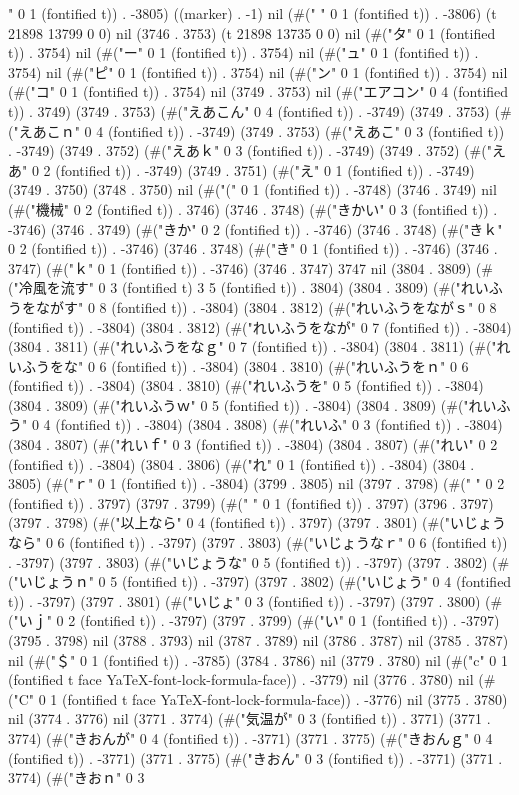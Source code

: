 " 0 1 (fontified t)) . -3805) ((marker) . -1) nil (#("	" 0 1 (fontified t)) . -3806) (t 21898 13799 0 0) nil (3746 . 3753) (t 21898 13735 0 0) nil (#("タ" 0 1 (fontified t)) . 3754) nil (#("ー" 0 1 (fontified t)) . 3754) nil (#("ュ" 0 1 (fontified t)) . 3754) nil (#("ピ" 0 1 (fontified t)) . 3754) nil (#("ン" 0 1 (fontified t)) . 3754) nil (#("コ" 0 1 (fontified t)) . 3754) nil (3749 . 3753) nil (#("エアコン" 0 4 (fontified t)) . 3749) (3749 . 3753) (#("えあこん" 0 4 (fontified t)) . -3749) (3749 . 3753) (#("えあこｎ" 0 4 (fontified t)) . -3749) (3749 . 3753) (#("えあこ" 0 3 (fontified t)) . -3749) (3749 . 3752) (#("えあｋ" 0 3 (fontified t)) . -3749) (3749 . 3752) (#("えあ" 0 2 (fontified t)) . -3749) (3749 . 3751) (#("え" 0 1 (fontified t)) . -3749) (3749 . 3750) (3748 . 3750) nil (#("(" 0 1 (fontified t)) . -3748) (3746 . 3749) nil (#("機械" 0 2 (fontified t)) . 3746) (3746 . 3748) (#("きかい" 0 3 (fontified t)) . -3746) (3746 . 3749) (#("きか" 0 2 (fontified t)) . -3746) (3746 . 3748) (#("きｋ" 0 2 (fontified t)) . -3746) (3746 . 3748) (#("き" 0 1 (fontified t)) . -3746) (3746 . 3747) (#("ｋ" 0 1 (fontified t)) . -3746) (3746 . 3747) 3747 nil (3804 . 3809) (#("冷風を流す" 0 3 (fontified t) 3 5 (fontified t)) . 3804) (3804 . 3809) (#("れいふうをながす" 0 8 (fontified t)) . -3804) (3804 . 3812) (#("れいふうをながｓ" 0 8 (fontified t)) . -3804) (3804 . 3812) (#("れいふうをなが" 0 7 (fontified t)) . -3804) (3804 . 3811) (#("れいふうをなｇ" 0 7 (fontified t)) . -3804) (3804 . 3811) (#("れいふうをな" 0 6 (fontified t)) . -3804) (3804 . 3810) (#("れいふうをｎ" 0 6 (fontified t)) . -3804) (3804 . 3810) (#("れいふうを" 0 5 (fontified t)) . -3804) (3804 . 3809) (#("れいふうｗ" 0 5 (fontified t)) . -3804) (3804 . 3809) (#("れいふう" 0 4 (fontified t)) . -3804) (3804 . 3808) (#("れいふ" 0 3 (fontified t)) . -3804) (3804 . 3807) (#("れいｆ" 0 3 (fontified t)) . -3804) (3804 . 3807) (#("れい" 0 2 (fontified t)) . -3804) (3804 . 3806) (#("れ" 0 1 (fontified t)) . -3804) (3804 . 3805) (#("ｒ" 0 1 (fontified t)) . -3804) (3799 . 3805) nil (3797 . 3798) (#("  " 0 2 (fontified t)) . 3797) (3797 . 3799) (#(" " 0 1 (fontified t)) . 3797) (3796 . 3797) (3797 . 3798) (#("以上なら" 0 4 (fontified t)) . 3797) (3797 . 3801) (#("いじょうなら" 0 6 (fontified t)) . -3797) (3797 . 3803) (#("いじょうなｒ" 0 6 (fontified t)) . -3797) (3797 . 3803) (#("いじょうな" 0 5 (fontified t)) . -3797) (3797 . 3802) (#("いじょうｎ" 0 5 (fontified t)) . -3797) (3797 . 3802) (#("いじょう" 0 4 (fontified t)) . -3797) (3797 . 3801) (#("いじょ" 0 3 (fontified t)) . -3797) (3797 . 3800) (#("いｊ" 0 2 (fontified t)) . -3797) (3797 . 3799) (#("い" 0 1 (fontified t)) . -3797) (3795 . 3798) nil (3788 . 3793) nil (3787 . 3789) nil (3786 . 3787) nil (3785 . 3787) nil (#("＄" 0 1 (fontified t)) . -3785) (3784 . 3786) nil (3779 . 3780) nil (#("c" 0 1 (fontified t face YaTeX-font-lock-formula-face)) . -3779) nil (3776 . 3780) nil (#("C" 0 1 (fontified t face YaTeX-font-lock-formula-face)) . -3776) nil (3775 . 3780) nil (3774 . 3776) nil (3771 . 3774) (#("気温が" 0 3 (fontified t)) . 3771) (3771 . 3774) (#("きおんが" 0 4 (fontified t)) . -3771) (3771 . 3775) (#("きおんｇ" 0 4 (fontified t)) . -3771) (3771 . 3775) (#("きおん" 0 3 (fontified t)) . -3771) (3771 . 3774) (#("きおｎ" 0 3 